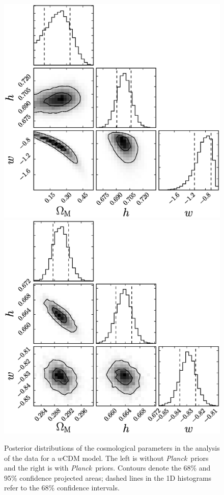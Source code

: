 \documentclass[12pt,a4paper]{article}
\newcommand\Planck{{\it Planck}\ }
\begin{document}
%
\begin{figure}
  \includegraphics[width=0.5\linewidth]{figures/betoule_wcdm_noprior_corner.eps}
  \includegraphics[width=0.5\linewidth]{figures/betoule_wcdm_withprior_corner.eps}
  \caption{Posterior distributions of the cosmological parameters in the
    analysis of the \citet{betoule2014} data for a $w$CDM model. The left is without 
    \Planck priors and the right is with \Planck priors. Contours denote the
    68\% and 95\% confidence projected areas; dashed lines in
    the 1D histograms refer to the 68\% confidence intervals.}
  \label{fig:betoule_wcdm_corner}
\end{figure}
%
\end{document}
